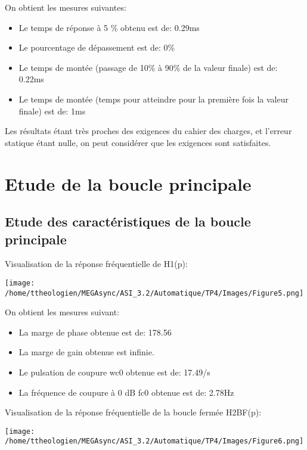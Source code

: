 \documentclass[a4paper,12pt]{article}
\begin{document}
			\par On obtient les mesures suivantes:
			\begin{itemize}
				\item Le temps de réponse à 5 \% obtenu est de: 0.29ms
				\item Le pourcentage de dépassement est de: 0\%
				\item Le temps de montée (passage de 10\% à 90\% de la valeur finale) est de: 0.22ms
				\item Le temps de montée (temps pour atteindre pour la première fois la valeur finale) est de: 1ms
			\end{itemize}
			Les résultats étant très proches des exigences du cahier des charges, et l'erreur statique étant nulle, on peut considérer que les exigences sont satisfaites.\\
			\pagebreak

	\section{Etude de la boucle principale}
		\subsection{Etude des caractéristiques de la boucle principale}
			\par Visualisation de la réponse fréquentielle de H1(p):
			\begin{center}
				\texttt{[image: /home/ttheologien/MEGAsync/ASI\_3.2/Automatique/TP4/Images/Figure5.png]}
			\end{center}

			\par On obtient les mesures suivant:
			\begin{itemize}
				\item La marge de phase obtenue est de: 178.56\degre
				\item La marge de gain obtenue est infinie.
				\item Le pulsation de coupure wc0 obtenue est de: 17.49/s
				\item La fréquence de coupure à 0 dB fc0 obtenue est de: 2.78Hz\\
			\end{itemize}

			\pagebreak

			\par Visualisation de la réponse fréquentielle de la boucle fermée H2BF(p):
			\begin{center}
				\texttt{[image: /home/ttheologien/MEGAsync/ASI\_3.2/Automatique/TP4/Images/Figure6.png]}
			\end{center}
\end{document}
